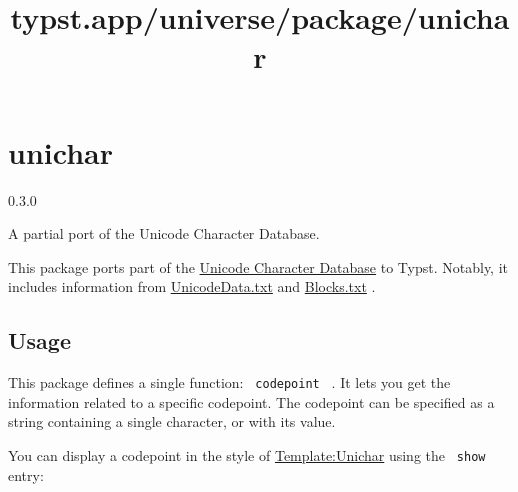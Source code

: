 \title{typst.app/universe/package/unichar}

\label{banner}
\section{unichar}\label{unichar}

{ 0.3.0 }

A partial port of the Unicode Character Database.

\label{readme}
This package ports part of the
\href{https://www.unicode.org/reports/tr44/}{Unicode Character Database}
to Typst. Notably, it includes information from
\href{https://unicode.org/reports/tr44/\#UnicodeData.txt}{UnicodeData.txt}
and \href{https://unicode.org/reports/tr44/\#Blocks.txt}{Blocks.txt} .

\subsection{Usage}\label{usage}

This package defines a single function: \texttt{\ codepoint\ } . It lets
you get the information related to a specific codepoint. The codepoint
can be specified as a string containing a single character, or with its
value.

\begin{Shaded}
\begin{Highlighting}[]
\end{Highlighting}
\end{Shaded}

\pandocbounded{}

You can display a codepoint in the style of
\href{https://en.wikipedia.org/wiki/Template:Unichar}{Template:Unichar}
using the \texttt{\ show\ } entry:

\begin{Shaded}
\begin{Highlighting}[]
\end{Highlighting}
\end{Shaded}

